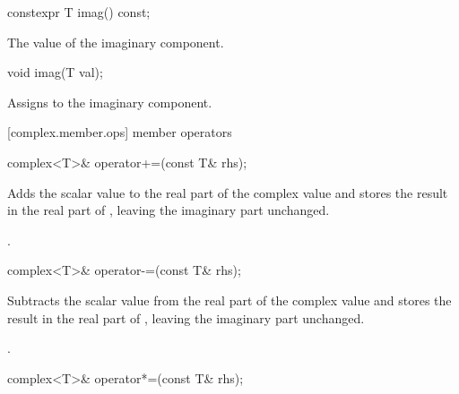 %
%
\begin{itemdecl}
constexpr T imag() const;
\end{itemdecl}

\begin{itemdescr}
\returns The value of the imaginary component.
\end{itemdescr}

%
%
\begin{itemdecl}
void imag(T val);
\end{itemdecl}

\begin{itemdescr}
\effects Assigns  to the imaginary component.
\end{itemdescr}

[complex.member.ops]{ member operators}

%
\begin{itemdecl}
complex<T>& operator+=(const T& rhs);
\end{itemdecl}

\begin{itemdescr}
\pnum
\effects
Adds the scalar value  to the real part of the complex value
and stores the result in the real part of
,
leaving the imaginary part unchanged.

\pnum
\returns
{}.
\end{itemdescr}

%
\begin{itemdecl}
complex<T>& operator-=(const T& rhs);
\end{itemdecl}

\begin{itemdescr}
\pnum
\effects
Subtracts the scalar value  from the real part of the complex value
and stores the result in the real part of
,
leaving the imaginary part unchanged.

\pnum
\returns
{}.
\end{itemdescr}

%
\begin{itemdecl}
complex<T>& operator*=(const T& rhs);
\end{itemdecl}

